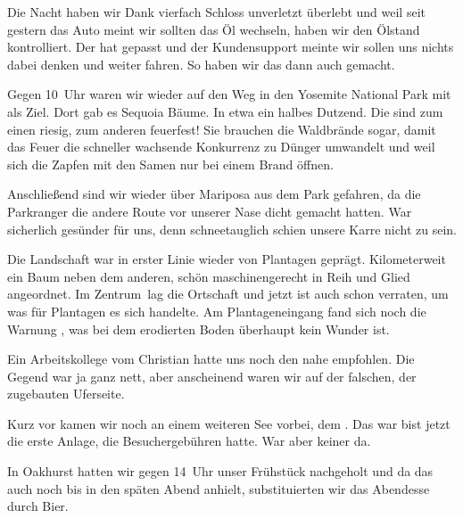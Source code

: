 Die Nacht haben wir Dank vierfach Schloss unverletzt überlebt und weil seit gestern das Auto meint wir sollten das Öl wechseln, haben wir den Ölstand kontrolliert.
Der hat gepasst und der Kundensupport meinte wir sollen uns nichts dabei denken und weiter fahren.
So haben wir das dann auch gemacht.

Gegen 10~Uhr waren wir wieder auf den Weg in den Yosemite National Park mit  als Ziel.
Dort gab es Sequoia Bäume.
In etwa ein halbes Dutzend.
Die sind zum einen riesig, zum anderen feuerfest!
Sie brauchen die Waldbrände sogar, damit das Feuer die schneller wachsende Konkurrenz zu Dünger umwandelt und weil sich die Zapfen mit den Samen nur bei einem Brand öffnen.

Anschließend sind wir wieder über Mariposa aus dem Park gefahren, da die Parkranger die andere Route vor unserer Nase dicht gemacht hatten.
War sicherlich gesünder für uns, denn schneetauglich schien unsere Karre nicht zu sein.

Die Landschaft war in erster Linie wieder von Plantagen geprägt.
Kilometerweit ein Baum neben dem anderen, schön maschinengerecht in Reih und Glied angeordnet.
Im \glqq Zentrum\grqq \, lag die Ortschaft  und jetzt ist auch schon verraten, um was für Plantagen es sich handelte.
Am Plantageneingang fand sich noch die Warnung , was bei dem erodierten Boden überhaupt kein Wunder ist.

Ein Arbeitskollege vom Christian hatte uns noch den  nahe  empfohlen.
Die Gegend war ja ganz nett, aber anscheinend waren wir auf der falschen, der zugebauten Uferseite.

Kurz vor  kamen wir noch an einem weiteren See vorbei, dem .
Das war bist jetzt die erste Anlage, die Besuchergebühren hatte.
War aber keiner da.

\thispagestyle{empty}
\newpage


In Oakhurst hatten wir gegen 14~Uhr unser Frühstück nachgeholt und da das auch noch bis in den späten Abend anhielt, substituierten wir das Abendesse durch Bier.

